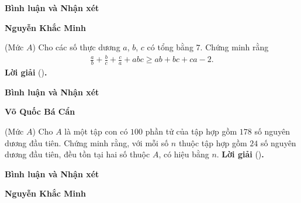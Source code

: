 \begin{multicols}{2}
	\textbf{Bình luận và Nhận xét}
	\begin{flushright}
		\textbf{Nguyễn Khắc Minh}
	\end{flushright}
	{}
	(Mức $A$) Cho các số thực dương $a$, $b$, $c$ có tổng bằng $7$. Chứng minh rằng
	\begin{align*}
		\frac{a}{b} + \frac{b}{c} + \frac{c}{a} + abc \ge ab + bc + ca - 2.
	\end{align*}
	\textbf{Lời giải} ()\textbf{.}
	\vskip 0.05cm
	
	\textbf{Bình luận và Nhận xét}
	\vskip 0.05cm
	
	\begin{flushright}
		\textbf{Võ Quốc Bá Cẩn}
	\end{flushright}
	{}
	(Mức $A$) Cho $A$ là một tập con có $100$ phần tử của tập hợp gồm $178$ số nguyên dương đầu tiên. Chứng minh rằng, với mỗi số $n$ thuộc tập hợp gồm $24$ số nguyên dương đầu tiên, đều tồn tại hai số thuộc $A$, có hiệu bằng $n$.
	\vskip 0.05cm
	\textbf{Lời giải} ()\textbf{.}
	\vskip 0.05cm
	
	\textbf{Bình luận và Nhận xét}
	\vskip 0.05cm
	\begin{flushright}
		\textbf{Nguyễn Khắc Minh}
	\end{flushright}
\end{multicols}

